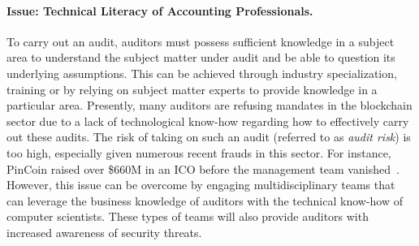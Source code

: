 \paragraph{Issue: Technical Literacy of Accounting Professionals.} To carry out an audit, auditors must possess sufficient knowledge in a subject area to understand the subject matter under audit and be able to question its underlying assumptions. This can be achieved through industry specialization, training or by relying on subject matter experts to provide knowledge in a particular area. Presently, many auditors are refusing mandates in the blockchain sector due to a lack of technological know-how regarding how to effectively carry out these audits. The risk of taking on such an audit (referred to as \textit{audit risk}) is too high, especially given numerous recent frauds in this sector. For instance, PinCoin raised over \$660M in an ICO before the management team vanished~\cite{techcrunchscammers}. However, this issue can be overcome by engaging multidisciplinary teams that can leverage the business knowledge of auditors with the technical know-how of computer scientists. These types of teams will also provide auditors with increased awareness of security threats.


